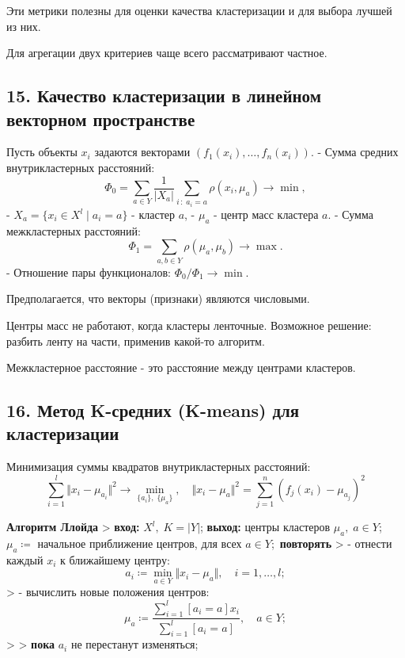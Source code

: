 Эти метрики полезны для оценки качества кластеризации и для выбора
лучшей из них.

Для агрегации двух критериев чаще всего рассматривают частное.

\subsection{15. Качество кластеризации в линейном векторном пространстве}

Пусть объекты $x_i$ задаются векторами ${\left( f_1{(x_i)}, \ldots, f_n{(x_i)} \right)}$.
- Сумма средних внутрикластерных расстояний: $$\Phi_0 = \sum_{a \in Y}{\frac{1}{\vert X_a \vert}} \sum_{i \, : \; a_i = a}{\rho{(x_i, \mu_a)}} \rightarrow \min,$$
    - $X_a = {\lbrace x_i \in X^l \; \vert \; a_i = a \rbrace}$ - кластер $a$,
    - $\mu_a$ - центр масс кластера $a$.
- Сумма межкластерных расстояний: $$\Phi_1 = \sum_{a, b \in Y}{\rho{(\mu_a, \mu_b)}} \rightarrow \max.$$
- Отношение пары функционалов: $\Phi_0 / \Phi_1 \rightarrow \min$.

Предполагается, что векторы (признаки) являются числовыми.

Центры масс не работают, когда кластеры ленточные.
Возможное решение: разбить ленту на части, применив какой-то алгоритм.

Межкластерное расстояние - это расстояние между центрами кластеров.

\subsection{16. Метод K-средних (K-means) для кластеризации}

Минимизация суммы квадратов внутрикластерных расстояний:
$$\displaystyle \sum_{i=1}^{l}{\Vert x_i - \mu_{a_i} \Vert}^2 \rightarrow \min_{{\lbrace a_i \rbrace}, \; {\lbrace \mu_a \rbrace}}, \quad {\Vert x_i - \mu_a \Vert}^2 = \sum_{j=1}^{n}{\left( f_j{(x_i)} - \mu_{a_j} \right)}^2$$

\textbf{Алгоритм Ллойда}
> \textbf{вход:} $X^l, \; K = {\vert Y \vert}$; \textbf{выход:} центры кластеров
$\mu_a, \; a \in Y$;\
$\mu_a \coloneqq$ начальное приближение центров, для всех $a \in Y$;\
\textbf{повторять}
> - отнести каждый $x_i$ к ближайшему центру:$$a_i \coloneqq \min_{a \in Y}{\Vert x_i - \mu_a \Vert}, \quad i = 1, \ldots, l;$$
> - вычислить новые положения центров:$$\mu_a \coloneqq \frac{\sum_{i=1}^{l}{{\left[ a_i = a \right]} x_i}}{\sum_{i=1}^{l}{{\left[ a_i = a \right]}}}, \quad a \in Y;$$
>
> \textbf{пока} $a_i$ не перестанут изменяться;

